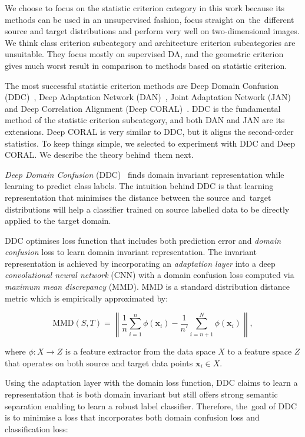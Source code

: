 We choose to focus on the statistic criterion category in this work
because its methods can be used in an unsupervised fashion,
focus straight on~the~different source and target distributions
and perform very well on two-dimensional images.
We think class criterion subcategory and architecture criterion subcategories are unsuitable.
They focus mostly on supervised DA, and the geometric criterion gives much worst result in comparison to methods based on statistic criterion.

The most successful statistic criterion methods are Deep Domain Confusion (DDC)~\cite{tzeng2014}, Deep Adaptation Network (DAN)~\cite{long2015}, Joint Adaptation Network (JAN)~\cite{long2017} and Deep Correlation Alignment (Deep CORAL)~\cite{sun2016}.
DDC is the fundamental method of the statistic criterion subcategory,
and both DAN and JAN are its extensions.
Deep CORAL is very similar to DDC, but it aligns the second-order statistics.
To keep things simple, we selected to experiment with DDC and Deep CORAL.
We describe the theory behind~them next.

\textit{Deep Domain Confusion} (DDC)~\cite{tzeng2014} finds domain invariant representation
while learning to predict class labels.
The intuition behind DDC is that learning representation
that minimises the distance between the source and~target distributions
will help a classifier trained on source labelled data
to be directly applied to the target domain.

DDC optimises loss function that includes both prediction error and \textit{domain confusion} loss to learn domain invariant representation.
The invariant representation is achieved by incorporating an \textit{adaptation layer} into a deep \textit{convolutional neural network} (CNN)
with a domain confusion loss computed via \textit{maximum mean discrepancy} (MMD).
MMD is a standard distribution distance metric which is empirically approximated by:

\begin{equation}
	\mathrm{MMD}(S, T) = \left\|
	\frac{1}{n} \sum_{i = 1}^{n} \phi(\mathbf{x}_i) -
	\frac{1}{n'} \sum_{i = n + 1}^{N} \phi(\mathbf{x}_i)
	\right\|,
	\label{maximam_mean_discrepancy}
\end{equation}

where \(\phi: X \to Z\) is a feature extractor
from the data space \(X\) to a feature space \(Z\)
that operates on both source and target data points \(\mathbf{x}_i \in X\).

Using the adaptation layer with the domain loss function, DDC claims to learn a representation
that is both domain invariant but still offers strong semantic separation enabling to learn a robust label classifier.
Therefore, the~goal of DDC is to minimise a loss that incorporates both domain confusion loss and classification loss:

